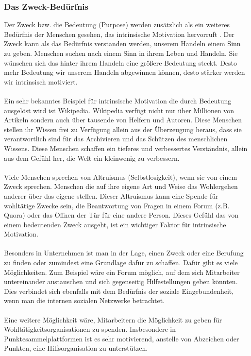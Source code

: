 \documentclass[a4paper,12pt]{scrartcl}
\begin{document}
\subsubsection{Das Zweck-Bedürfnis}
Der Zweck bzw. die Bedeutung (Purpose) werden zusätzlich als ein weiteres Bedürfnis der Menschen gesehen, das intrinsische Motivation hervorruft \cite{Pink2010}. Der Zweck kann als das Bedürfnis verstanden werden, unserem Handeln einem Sinn zu geben. Menschen suchen nach einem Sinn in ihrem Leben und Handeln. Sie wünschen sich das hinter ihrem Handeln eine größere Bedeutung steckt. Desto mehr Bedeutung wir unserem Handeln abgewinnen können, desto stärker werden wir intrinsisch motiviert. 
\\\\
Ein sehr bekanntes Beispiel für intrinsische Motivation die durch Bedeutung ausgelöst wird ist Wikipedia. Wikipedia verfügt nicht nur über Millionen von Artikeln sondern auch über tausende von Helfern und Autoren. Diese Menschen stellen ihr Wissen frei zu Verfügung allein aus der Überzeugung heraus, dass sie verantwortlich sind für das Archivieren und das Schützen des menschlichen Wissens. Diese Menschen schaffen ein tieferes und verbessertes Verständnis, allein aus dem Gefühl her, die Welt ein kleinwenig zu verbessern.
\\\\
Viele Menschen sprechen von Altruismus (Selbstlosigkeit), wenn sie von einem Zweck sprechen. Menschen die auf ihre eigene Art und Weise das Wohlergehen anderer über das eigene stellen. Dieser Altruismus kann eine Spende für wohltätige Zwecke sein, die Beantwortung von Fragen in einem Forum (z.B. Quora) oder das Öffnen der Tür für eine andere Person. Dieses Gefühl das von einem bedeutenden Zweck ausgeht, ist ein wichtiger Faktor für intrinsische Motivation.
\\\\
Besonders in Unternehmen ist man in der Lage, einen Zweck oder eine Berufung zu finden oder zumindest eine Grundlage dafür zu schaffen. Dafür gibt es viele Möglichkeiten. Zum Beispiel wäre ein Forum möglich, auf dem sich Mitarbeiter untereinander austauschen und sich gegenseitig Hilfestellungen geben könnten. Dies verbindet sich ebenfalls mit dem Bedürfnis der soziale Eingebundenheit, wenn man die internen sozialen Netzwerke betrachtet.
\\\\ 
Eine weitere Möglichkeit wäre, Mitarbeitern die Möglichkeit zu geben für Wohltätigkeitsorganisationen zu spenden. Insbesondere in Punktesammelplattformen ist es sehr motivierend, anstelle von Abzeichen oder Punkten, eine Hilfsorganisation zu unterstützen.
\end{document}
